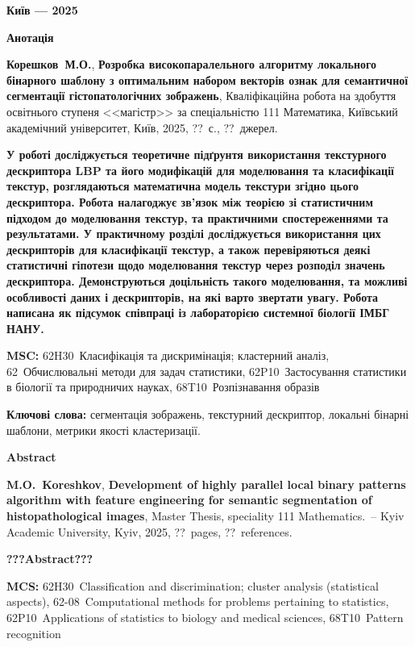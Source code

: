\documentclass{thesis}
\newcommand{\MyInitialName}{Корешков~М.О.}
\newcommand{\ThesisName}{Розробка високопаралельного алгоритму локального бінарного шаблону з оптимальним набором векторів ознак для семантичної сегментації гістопатологічних зображень}
\newcommand{\NumPages}{??}
\newcommand{\NumCitations}{??}
\newcommand{\MyReverseInitialNameEn}{M.O.~Koreshkov}
\newcommand{\ThesisNameEn}{Development of highly parallel local binary patterns algorithm with feature engineering for semantic segmentation of histopathological images}
\newcommand{\MSC}{62H30~Класифікація та дискримінація; кластерний аналіз, 62\nobreakdash-08~Обчислювальні методи для задач статистики, 62P10~Застосування статистики в біології та природничих науках, 68T10~Розпізнавання образів}
\newcommand{\MSCEn}{62H30~Classification and discrimination; cluster analysis (statistical aspects), 62-08~Computational methods for problems pertaining to statistics, 62P10~Applications of statistics to biology and medical sciences, 68T10~Pattern recognition}
\newcommand{\1}{\mathbb 1}
\begin{document}
\vfill

\centerline{\bf Київ --- 2025}

\newpage

\begin{center}
\Large \bf Анотація
\end{center}

\noindent
\textbf{\MyInitialName}, \textbf{\ThesisName}, Кваліфікаційна робота на здобуття освітнього ступеня <<магістр>> за спеціальністю 111 Математика, Київський академічний університет, Київ, 2025, \NumPages~с., \NumCitations~джерел.

\bigskip


{\bf У роботі досліджується теоретичне підґрунтя використання текстурного дескриптора LBP та його модифікацій для моделювання та класифікації текстур, 
розглядаються математична модель текстури згідно цього дескриптора.
Робота налагоджує зв'язок між теорією зі статистичним підходом до моделювання текстур, та практичними спостереженнями та результатами.
У практичному розділі досліджується використання цих дескрипторів для класифікації текстур, 
а також перевіряються деякі статистичні гіпотези щодо моделювання текстур через розподіл значень дескриптора.
Демонструються доцільність такого моделювання, та можливі особливості даних і дескрипторів, на які варто звертати увагу.
Робота написана як підсумок співпраці із лабораторією системної біології ІМБГ НАНУ.}

\bigskip

\noindent
{\bf MSC:} \MSC

\bigskip

\noindent
{\bf Ключові слова:} сегментація зображень, текстурний дескриптор, локальні бінарні шаблони, метрики якості кластеризації.
\bigskip

\newpage

\begin{center}
\Large \bf Abstract
\end{center}

\noindent
\textbf{\MyReverseInitialNameEn}, \textbf{\ThesisNameEn}, Master Thesis, speciality 111 Mathematics.~--
Kyiv Academic University, Kyiv, 2025, \NumPages~pages, \NumCitations~references.

\bigskip
{\bf ???Abstract???}

\bigskip

\noindent
{\bf MCS:} \MSCEn %

\end{document}
